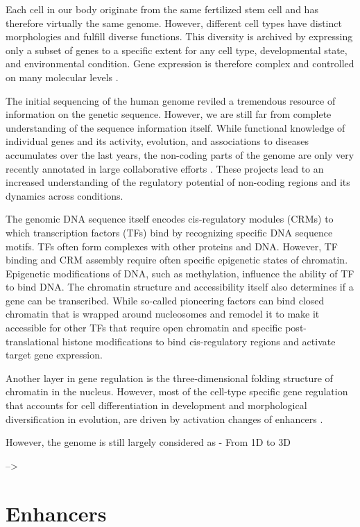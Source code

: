 \documentclass[a4paper,twoside=true,openright,parskip=full,chapterprefix=true,11pt,headings=normal,bibliography=totoc,listof=totoc,titlepage=on,captions=tableabove,draft=false]{scrreprt}
\theoremstyle{definition}
\theoremstyle{definition}
\theoremstyle{definition}
\theoremstyle{remark}
\begin{document}
Each cell in our body originate from the same fertilized stem cell and
has therefore virtually the same genome. However, different cell types
have distinct morphologies and fulfill diverse functions. This diversity
is archived by expressing only a subset of genes to a specific extent
for any cell type, developmental state, and environmental condition.
Gene expression is therefore complex and controlled on many molecular
levels \citep{Lelli2012}.

The initial sequencing of the human genome reviled a tremendous resource
of information on the genetic sequence. However, we are still far from
complete understanding of the sequence information itself. While
functional knowledge of individual genes and its activity, evolution,
and associations to diseases accumulates over the last years, the
non-coding parts of the genome are only very recently annotated in large
collaborative efforts \citep{Dunham2012, Kundaje2015, Andersson2014}.
These projects lead to an increased understanding of the regulatory
potential of non-coding regions and its dynamics across conditions.

The genomic DNA sequence itself encodes cis-regulatory modules (CRMs) to
which transcription factors (TFs) bind by recognizing specific DNA
sequence motifs. TFs often form complexes with other proteins and DNA.
However, TF binding and CRM assembly require often specific epigenetic
states of chromatin. Epigenetic modifications of DNA, such as
methylation, influence the ability of TF to bind DNA. The chromatin
structure and accessibility itself also determines if a gene can be
transcribed. While so-called pioneering factors can bind closed
chromatin that is wrapped around nucleosomes and remodel it to make it
accessible for other TFs that require open chromatin and specific
post-translational histone modifications to bind cis-regulatory regions
and activate target gene expression.

Another layer in gene regulation is the three-dimensional folding
structure of chromatin in the nucleus. However, most of the cell-type
specific gene regulation that accounts for cell differentiation in
development and morphological diversification in evolution, are driven
by activation changes of enhancers \citep{Long2016}.

However, the genome is still largely considered as - From 1D to 3D

--\textgreater{}

\hypertarget{enhancers}{%
\section{Enhancers}\label{enhancers}}
\end{document}
